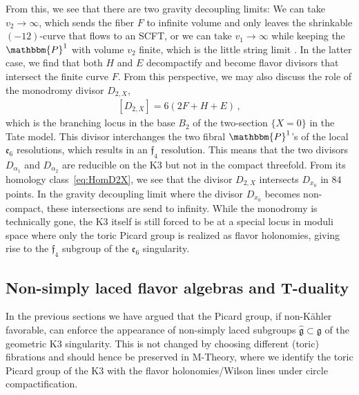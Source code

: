 \documentclass[11pt]{article}
\numberwithin{equation}{section}
\newcommand{\fg}{\mathfrak{g}}
\newcommand{\ff}{\mathfrak{f}}
\newcommand{\fe}{\mathfrak{e}}
\begin{document}
From this, we see that there are two gravity decoupling limits: We can take $v_2\to\infty$, which sends the fiber $F$ to infinite volume and only leaves the shrinkable $(-12)$-curve that flows to an SCFT, or we can take $v_1 \rightarrow \infty$ while keeping the $\mathbbm{P}^1$ with volume $v_2$ finite, which is the little string limit \cite{Hayashi:2023hqa}. In the latter case, we find that both $H$ and $E$ decompactify and become flavor divisors that intersect the finite curve $F$. From this perspective, we may also discuss the role of the monodromy divisor $D_{2,X}$, 
\begin{align}
\label{eq:HomD2X}
    [D_{2,X}]=6(2 F+H+E) \,,
\end{align} 
which is the branching locus in the base $B_2$ of the two-section $\{X=0\}$ in the Tate model. This divisor interchanges the two fibral $\mathbbm{P}^1$'s of the local $\fe_6$ resolutions, which results in an $\ff_4$ resolution. This means that the two divisors $D_{\alpha_1}$ and $D_{\alpha_2}$ are reducible on the K3 but not in the compact threefold. From its homology class~\eqref{eq:HomD2X}, we see that the divisor $D_{2,X}$ intersects $D_{x_0}$ in $84$ points. In the gravity decoupling limit where the divisor $D_{x_0}$ becomes non-compact, these intersections are send to infinity. While the monodromy is technically gone, the K3 itself is still forced to be at a special locus in moduli space where only the toric Picard group is realized as flavor holonomies, giving rise to the $\ff_4$ subgroup of the $\fe_6$ singularity.


\subsection{Non-simply laced flavor algebras and T-duality}
In the previous sections we have argued that the Picard group, if non-K\"ahler favorable, can enforce the appearance of non-simply laced subgroups $\widehat{\fg}\subset \fg$ of the geometric K3 singularity. This is not changed by choosing different (toric) fibrations and should hence be preserved in M-Theory, where we identify the toric Picard group of the K3 with the flavor holonomies/Wilson lines under circle compactification. 
 
\end{document}
